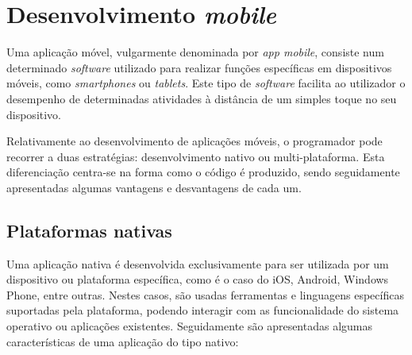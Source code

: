 \section{Desenvolvimento \textit{mobile}}

Uma aplicação móvel, vulgarmente denominada por \textit{app mobile}, consiste num determinado \textit{software} utilizado para realizar funções específicas em dispositivos móveis, como \textit{smartphones} ou \textit{tablets}. Este tipo de \textit{software} facilita ao utilizador o desempenho de determinadas atividades à distância de um simples toque no seu dispositivo. 

Relativamente ao desenvolvimento de aplicações móveis, o programador pode recorrer a duas estratégias: desenvolvimento nativo ou multi-plataforma. Esta diferenciação centra-se na forma como o código é produzido, sendo seguidamente apresentadas algumas  vantagens e desvantagens de cada um. 



\subsection{Plataformas nativas}

Uma aplicação nativa é desenvolvida exclusivamente para ser utilizada por um dispositivo ou plataforma específica, como é o caso do iOS, Android, Windows Phone, entre outras. Nestes casos, são usadas ferramentas e linguagens específicas suportadas pela plataforma, podendo interagir com as funcionalidade do sistema operativo ou aplicações existentes. Seguidamente são apresentadas algumas características de uma aplicação do tipo nativo\cite{Ibm2012a}: 

